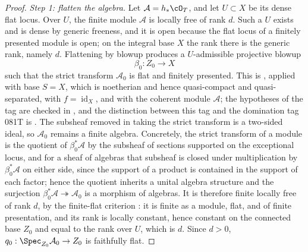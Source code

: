 \begin{proof}
\emph{Step 1: flatten the algebra.}
Let $\mathcal A=h_*\cO_T$, and let $U\subset X$ be its dense flat locus.
Over $U$, the finite module $\mathcal A$ is locally free of rank $d$.
Such a $U$ exists and is dense by generic freeness, and it is open because
the flat locus of a finitely presented module is open; on the integral base
$X$ the rank there is the generic rank, namely $d$.
Flattening by blowup
\cite[\href{https://stacks.math.columbia.edu/tag/0815}{Tag 0815}]
{stacks-project} produces a $U$-admissible projective blowup
\[
                         \beta_0:Z_0\longrightarrow X
\]
such that the strict transform $\mathcal A_0$ is flat and finitely presented.
This is , applied with base $S=X$, which is
noetherian and hence quasi-compact and quasi-separated, with
$f=\operatorname{id}_X$, and with the coherent module $\mathcal A$; the
hypotheses of the tag are checked in , and the
distinction between this tag and the domination tag 081T is
.
The subsheaf removed in taking the strict transform is a two-sided ideal,
so $\mathcal A_0$ remains a finite algebra.  Concretely, the strict
transform of a module is the quotient of $\beta_0^*\mathcal A$ by the
subsheaf of sections supported on the exceptional locus, and for a sheaf of
algebras that subsheaf is closed under multiplication by
$\beta_0^*\mathcal A$ on either side, since the support of a product is
contained in the support of each factor; hence the quotient inherits a unital
algebra structure and the surjection
$\beta_0^*\mathcal A\twoheadrightarrow\mathcal A_0$ is a morphism of
algebras.  It is therefore finite locally
free of rank $d$, by the finite-flat criterion
\cite[\href{https://stacks.math.columbia.edu/tag/02K9}{Tag 02K9}]
{stacks-project}: it is finite as a module, flat, and of finite
presentation, and its rank is locally constant, hence constant on the
connected base $Z_0$ and equal to the rank over $U$, which is $d$.
Since $d>0$, $q_0:\Spec_{Z_0}\mathcal A_0\to Z_0$ is faithfully flat.


\end{proof}
